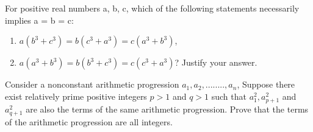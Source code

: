 \item For positive real numbers a, b, c, which of the following statements
necessarily implies a = b = c: 
\begin{enumerate}
\item $a(b^3 + c^3 ) = b(c^3 + a^3 ) = c(a^3 + b^3 )$,
\item $a(a^3 + b^3 ) = b(b^3 + c^3 ) = c(c^3 + a^3 )$? Justify your answer.
\end{enumerate}

\item Consider a nonconstant arithmetic progression $a_1, a_2,........, a_n$, Suppose there
exist relatively prime positive integers $p > 1$ and $q > 1$ such that $a_1^{2},a_{p+1}^{2}$ and
$a_{q+1}^{2}$ are also the terms of the same arithmetic progression. Prove that the terms of the arithmetic progression are all integers.













